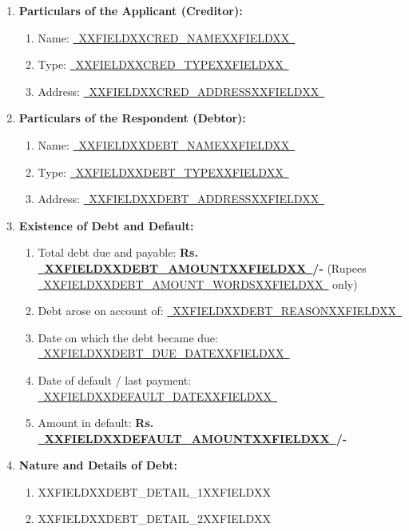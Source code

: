 \documentclass[12pt,a4paper]{article}
\newcommand{\fillline}[1]{\underline{~#1~}}
\begin{document}
\begin{enumerate}[label=\textbf{\arabic*.}, leftmargin=*, itemsep=1em]

    \item \textbf{Particulars of the Applicant (Creditor):}
    \begin{enumerate}[label=(\alph*)]
        \item Name: \fillline{XXFIELDXXCRED_NAMEXXFIELDXX}
        \item Type: \fillline{XXFIELDXXCRED_TYPEXXFIELDXX}
        \item Address: \fillline{XXFIELDXXCRED_ADDRESSXXFIELDXX}
    \end{enumerate}

    \item \textbf{Particulars of the Respondent (Debtor):}
    \begin{enumerate}[label=(\alph*)]
        \item Name: \fillline{XXFIELDXXDEBT_NAMEXXFIELDXX}
        \item Type: \fillline{XXFIELDXXDEBT_TYPEXXFIELDXX}
        \item Address: \fillline{XXFIELDXXDEBT_ADDRESSXXFIELDXX}
    \end{enumerate}

    \item \textbf{Existence of Debt and Default:}
    \begin{enumerate}[label=(\alph*)]
        \item Total debt due and payable: \textbf{Rs. \fillline{XXFIELDXXDEBT_AMOUNTXXFIELDXX}/-}
              (Rupees \fillline{XXFIELDXXDEBT_AMOUNT_WORDSXXFIELDXX} only)
        \item Debt arose on account of: \fillline{XXFIELDXXDEBT_REASONXXFIELDXX}
        \item Date on which the debt became due: \fillline{XXFIELDXXDEBT_DUE_DATEXXFIELDXX}
        \item Date of default / last payment: \fillline{XXFIELDXXDEFAULT_DATEXXFIELDXX}
        \item Amount in default: \textbf{Rs. \fillline{XXFIELDXXDEFAULT_AMOUNTXXFIELDXX}/-}
    \end{enumerate}

    \item \textbf{Nature and Details of Debt:}
    \begin{enumerate}[label=(\alph*)]
        \item XXFIELDXXDEBT_DETAIL_1XXFIELDXX
        \item XXFIELDXXDEBT_DETAIL_2XXFIELDXX
    \end{enumerate}


\end{enumerate}
\end{document}
